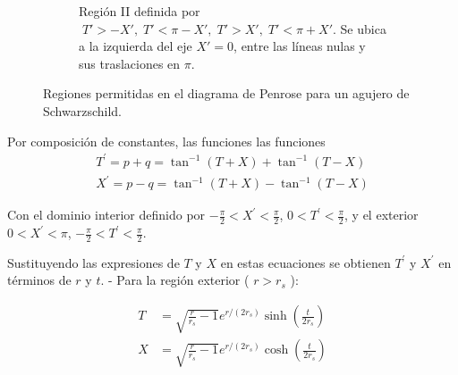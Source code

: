 \begin{figure}[H]
\begin{subfigure}{0.5\textwidth}
    \caption{Región II definida por $\;T' > -X',\; T' < \pi - X',\; T' > X',\; T' < \pi + X'$. Se ubica a la izquierda del eje \(X'=0\), entre las líneas nulas y sus traslaciones en \(\pi\).}
  \end{subfigure}
  \caption{Regiones permitidas en el diagrama de Penrose para un agujero de Schwarzschild.}
\end{figure}
Por composición de constantes, las funciones las funciones
$$
  \begin{array}{l}
    T^{\prime}=p+q=\tan ^{-1}(T+X)+\tan ^{-1}(T-X) \\
    X^{\prime}=p-q=\tan ^{-1}(T+X)-\tan ^{-1}(T-X)
  \end{array}
$$

Con el dominio interior definido por $-\frac{\pi}{2}<X^{\prime}<\frac{\pi}{2}$, $0<T^{\prime}<\frac{\pi}{2}$, y el exterior $0<X^{\prime}<\pi$, $-\frac{\pi}{2}<T^{\prime}<\frac{\pi}{2}$.

Sustituyendo las expresiones de $T$ y $X$ en estas ecuaciones se obtienen $T^{\prime}$ y $X^{\prime}$ en términos de $r$ y $t$.
- Para la región exterior ( $r>r_s$ ):

$$
  \begin{aligned}
    T & =\sqrt{\frac{r}{r_s}-1} e^{r /\left(2 r_s\right)} \sinh \left(\frac{t}{2 r_s}\right) \\
    X & =\sqrt{\frac{r}{r_s}-1} e^{r /\left(2 r_s\right)} \cosh \left(\frac{t}{2 r_s}\right)
  \end{aligned}
$$

